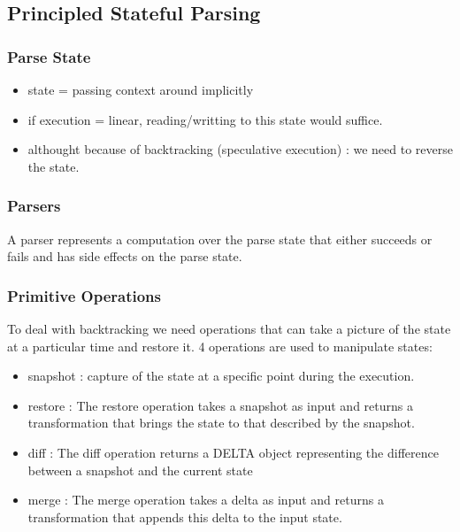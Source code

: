 	\subsection{Principled Stateful Parsing}



	\subsubsection{Parse State}
	\begin{itemize}
		\item state = passing context around implicitly
		\item if execution = linear, reading/writting to this state would suffice.
		\item althought because of backtracking (speculative execution) : we need to reverse the state.
	\end{itemize}
	\subsubsection{Parsers} A parser represents a computation over the parse state that either succeeds or fails and has side effects on the parse state.
	\subsubsection{Primitive Operations}
	To deal with backtracking we need operations that can take a picture of the state at a particular time and restore it. 4 operations are used to manipulate states:
	\begin{itemize}
		\item snapshot : capture of the state at a specific point during the execution. 
		\item restore : The restore operation takes a snapshot as input and returns a transformation that brings the state to that described by the snapshot.
		\item diff : The diff operation returns a DELTA object representing the difference between a snapshot and the current state
		\item merge : The merge operation takes a delta as input and returns a transformation that appends this delta to the input state.
	\end{itemize}


